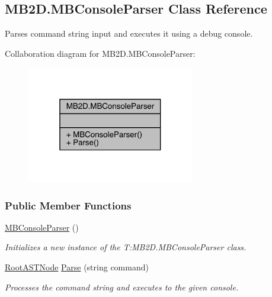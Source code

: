 \hypertarget{class_m_b2_d_1_1_m_b_console_parser}{}\subsection{M\+B2\+D.\+M\+B\+Console\+Parser Class Reference}
\label{class_m_b2_d_1_1_m_b_console_parser}


Parses command string input and executes it using a debug console.  




Collaboration diagram for M\+B2\+D.\+M\+B\+Console\+Parser\+:
\nopagebreak
\begin{figure}[H]
\begin{center}
\leavevmode
\includegraphics[width=208pt]{class_m_b2_d_1_1_m_b_console_parser__coll__graph}
\end{center}
\end{figure}
\subsubsection*{Public Member Functions}
\begin{DoxyCompactItemize}
\item 
\hyperlink{class_m_b2_d_1_1_m_b_console_parser_ad14d20f3d88fade887577eb105837008}{M\+B\+Console\+Parser} ()
\begin{DoxyCompactList}\small\item\em Initializes a new instance of the T\+:\+M\+B2\+D.\+M\+B\+Console\+Parser class. \end{DoxyCompactList}\item 
\hyperlink{class_m_b2_d_1_1_root_a_s_t_node}{Root\+A\+S\+T\+Node} \hyperlink{class_m_b2_d_1_1_m_b_console_parser_a880d5a9c56db05d19610df482b15bbf0}{Parse} (string command)
\begin{DoxyCompactList}\small\item\em Processes the command string and executes to the given console. \end{DoxyCompactList}\end{DoxyCompactItemize}


